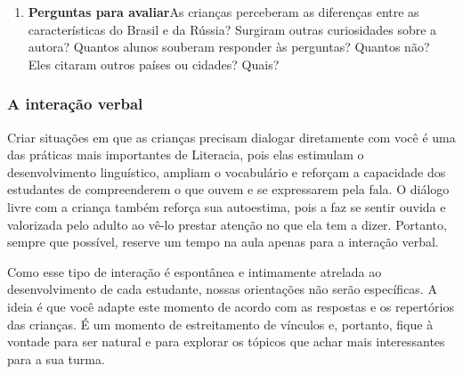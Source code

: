 \documentclass[11pt]{extarticle}
\begin{document}
\begin{enumerate}

\item \textbf{Perguntas para avaliar}\quad As crianças perceberam as diferenças entre as características do Brasil e da Rússia? Surgiram outras curiosidades sobre a autora? Quantos alunos souberam responder às perguntas? Quantos não? Eles citaram outros países ou cidades? Quais? 

\end{enumerate}


\subsubsection{A interação verbal} 
Criar situações em que as crianças precisam dialogar diretamente com 
você é uma das práticas mais importantes de Literacia, pois elas estimulam 
o desenvolvimento linguístico, ampliam o vocabulário e reforçam a 
capacidade dos estudantes de compreenderem o que ouvem e se expressarem 
pela fala. O diálogo livre com a criança também reforça sua autoestima, pois 
a faz se sentir ouvida e valorizada pelo adulto ao vê-lo prestar atenção 
no que ela tem a dizer. Portanto, sempre que possível, reserve um tempo na 
aula apenas para a interação verbal. 


Como esse tipo de interação é espontânea e intimamente atrelada ao 
desenvolvimento de cada estudante, nossas orientações não serão específicas. 
A ideia é que você adapte este momento de acordo com as respostas e os 
repertórios das crianças. É um momento de estreitamento de vínculos e, portanto, 
fique à vontade para ser natural e para explorar os tópicos que achar 
mais interessantes para a sua turma.
\end{document}
